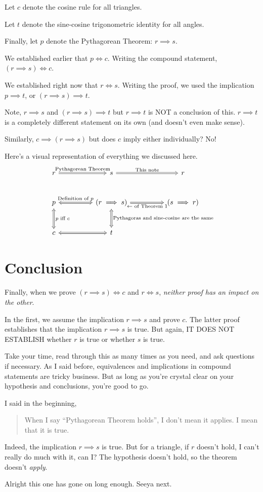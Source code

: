 Let $c$ denote the cosine rule for all triangles.

Let $t$ denote the sine-cosine trigonometric identity for all angles.

Finally, let $p$ denote the Pythagorean Theorem: $r \implies s$.

We established earlier that $p \iff c$. Writing the compound statement, $(r \implies s) \iff c$.

We established right now that $r \iff s$. Writing the proof, we used the implication $p \implies t$, or $(r \implies s) \implies t$.

Note, $r \implies s$ and $(r \implies s) \implies t$ but $r \implies t$ is NOT a conclusion of this. $r \implies t$ is a completely different statement on its own (and doesn't even make sense).

Similarly, $c \implies (r \implies s)$ but does $c$ imply either individually? No!

Here's a visual representation of everything we discussed here.
\[
\begin{tikzcd}[column sep=huge, row sep=large]
r \arrow[r, Rightarrow, "\text{Pythagorean Theorem}"] & s \arrow[r, Rightarrow, "\text{This note}"] & r\\
p \arrow[r, Leftrightarrow, "\text{Definition of $p$}"] & (r \implies s) \arrow[d, Leftrightarrow, "\text{Pythagoras and sine-cosine are the same}"] & (s \implies r) \arrow [l, Leftarrow, "\text{$\leftarrow$ of Theorem 1}"] \\
c \arrow[u, Leftrightarrow, swap, "\text{$p$ iff $c$}"] \arrow[r, Leftrightarrow] & t
\end{tikzcd}
\]

\section*{Conclusion}
Finally, when we prove $(r \implies s) \iff c$ and $r \iff s$,  \textit{neither proof has an impact on the other}.

In the first, we assume the implication $r \implies s$ and prove $c$. The latter proof establishes that the implication $r \implies s$ is true. But again, IT DOES NOT ESTABLISH whether $r$ is true or whether $s$ is true.

Take your time, read through this as many times as you need, and ask questions if necessary. As I said before, equivalences and implications in compound statements are tricky business. But as long as you're crystal clear on your hypothesis and conclusions, you're good to go.

I said in the beginning,
\begin{quote}
    When I say ``Pythagorean Theorem holds'', I don't mean it applies. I mean that it is true.
\end{quote}

Indeed, the implication $r \implies s$ is true. But for a triangle, if $r$ doesn't hold, I can't really do much with it, can I? The hypothesis doesn't hold, so the theorem doesn't \textit{apply}.

Alright this one has gone on long enough. Seeya next.
